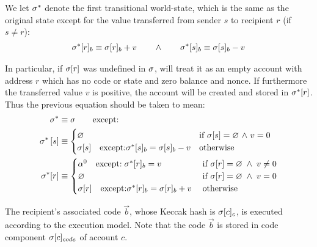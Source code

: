 We let $\mathbf{\sigma}^*$ denote the first transitional world-state, which is the same as the original state except for the value transferred from sender $s$ to recipient $r$ (if $s\ne r$):
\begin{align}
	\mathbf{\sigma}^*[r]_b\equiv \mathbf{\sigma}[r]_b+v \qquad \land  \qquad\mathbf{\sigma}^*[s]_b\equiv \mathbf{\sigma}[s]_b-v
	\label{state:first transitional}
\end{align}

In particular, if $\mathbf{\sigma}[r]$ was undefined in $\mathbf{\sigma}$, \name will treat it as an empty account with address $r$ which has no code or state and zero balance and nonce.
If furthermore the transferred value $v$ is positive, the account will be created and stored in $\mathbf{\sigma}^*[r]$. 
Thus the previous equation should be taken to mean:
\begin{align}
	\mathbf{\sigma}^* &\equiv \mathbf{\sigma} \qquad \mbox{except:}\\
	\mathbf{\sigma}^*\left[ s \right] &\equiv \begin{cases}
		\varnothing & \mbox{if $\mathbf{\sigma}[s]=\varnothing$ $\land$ $v=0$}\\
		\mathbf{\sigma}[s]\quad\mbox{except:}\mathbf{\sigma}^*[s]_b=\mathbf{\sigma}[s]_b-v & \mbox{otherwise}
	\end{cases}\\
	\mathbf{\sigma}^*[r] &\equiv \begin{cases}
		\mathbf{\alpha}^0 \quad\text{except:}\; \mathbf{\sigma}^*[r]_b=v  & \mbox{if $\mathbf{\sigma}[r]=\varnothing \;\land\; v\ne 0$}\\
		\varnothing & \mbox{if $\mathbf{\sigma}[r]=\varnothing \;\land\; v = 0$}\\
		\mathbf{\sigma}[r]\quad\mbox{except:}\mathbf{\sigma}^*[r]_b=\mathbf{\sigma}[r]_b+v\; & \mbox{otherwise}
	\end{cases}
\end{align}

The recipient's associated code $\vec{b}$, whose Keccak hash is $\mathbf{\sigma}[c]_c$, is executed according to the execution model.
Note that the code $\vec{b}$ is stored in code component $\mathbf{\sigma}[c]_{code}$ of account $c$. %

